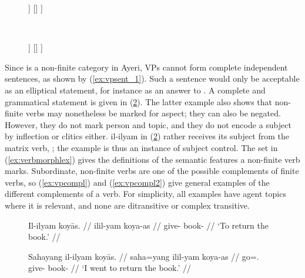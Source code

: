 \begin{figure}
\ex{}\label{ex:vpcstruct}
\begin{minipage}[t]{.5\remaining}
\tl\quad%
\begin{forest}
[\anno{VP}
	[\anno{\xbar{V}}
		[\anno{\xhead{V}}]
		[{\anno[\pass{\GF}]{XP}}]		
	]
	[{}]
]
\end{forest}
\end{minipage}
~
\begin{minipage}[t]{.5\remaining}
\tl\quad%
\begin{forest}
[\anno{VP}
	[\anno{VP}
		[\anno{\xhead{V}}]
		[{\anno[\elem{\Adjc}]{AdvP}}]
	]
	[{}]
]
\end{forest}
\end{minipage}
\xe
\end{figure}

Since  is a non-finite category in Ayeri, VPs cannot form complete
independent sentences, as shown by (\ref{ex:vpsent_1}). Such a sentence would
only be acceptable as an elliptical statement, for instance as an answer to
. A complete and
grammatical statement is given in (\ref{ex:vpsent_2}). The latter example also
shows that non-finite verbs may nonetheless be marked for aspect; they can also
be negated. However, they do not mark person and topic, and they do not encode
a subject by inflection or clitics either.  {il-ilyam} in
(\ref{ex:vpsent_2}) rather receives its subject from the matrix verb,
; the example is thus an instance of subject
control. The set in (\ref{ex:verbmorphlex}) gives the definitions of the
semantic features a non-finite verb marks. Subordinate, non-finite verbs are
one of the possible complements of finite verbs, so (\ref{ex:vpcompl}) and
(\ref{ex:vpcompl2}) give general examples of the different complements of a
verb. For simplicity, all examples have agent topics where it is relevant, and
none are ditransitive or complex transitive.

\begin{figure}
\pex\label{ex:vpsent}
\a\label{ex:vpsent_1}\ljudge*\begingl
	\gla Il-ilyam koyās. //
	\glb il\til{}il-yam koya-as //
	\glc \Iter{}\til{}give-\Ptcp{} book-\Parg{} //
	\glft `To return the book.' //
\endgl

\a\label{ex:vpsent_2}\begingl
	\gla Sahayang il-ilyam koyās. //
	\glb saha=yang il\til{}il-yam koya-as //
	\glc go=\Fsg{}.\Aarg{} \Iter{}\til{}give-\Ptcp{} book-\Parg{} //
	\glft `I went to return the book.' //
\endgl
\xe
\end{figure}

